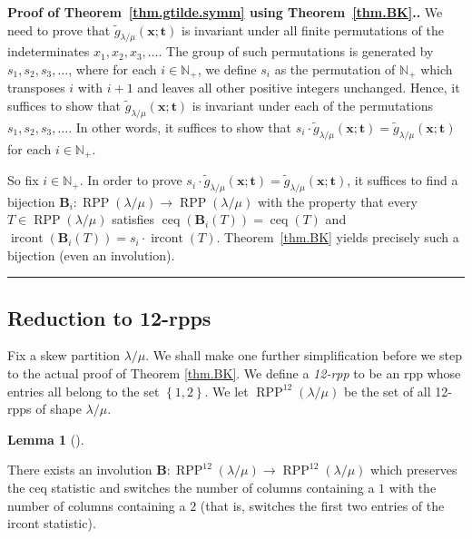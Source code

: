 \documentclass[numbers=enddot,12pt,final,onecolumn,notitlepage]{scrartcl}%
\theoremstyle{definition}
\newtheorem{lem}[theo]{Lemma}
\newenvironment{lemma}[1][]
{\begin{lem}[#1]\begin{leftbar}}
{\end{leftbar}\end{lem}}
\newenvironment{proof}[1][Proof]{\noindent\textbf{#1.} }{\ \rule{0.5em}{0.5em}}
\newcommand{\Nplus}{\mathbb{N}_{+}}
\def\ceq{{\operatorname{ceq}}}
\def\ircont{{\operatorname{ircont}}}
\def\t{{\mathbf{t}}}
\def\x{{\mathbf{x}}}
\def\lm{{\lambda/\mu}}
\def\OneTwoRPP{{\operatorname{RPP}^{12}\left(  \lambda/\mu\right)}}
\begin{document}
\begin{proof}[Proof of Theorem~\ref{thm.gtilde.symm} using
Theorem~\ref{thm.BK}.]
We need to prove that $\widetilde{g}_{\lambda/\mu}(\x;\t)$ is invariant
under all finite permutations of the indeterminates
$x_1, x_2, x_3, \ldots$. The group of such permutations is generated by
$s_1, s_2, s_3, \ldots$, where for each $i \in \Nplus$, we define $s_i$
as the permutation of $\Nplus$ which transposes $i$ with $i+1$ and
leaves all other positive integers unchanged. Hence, it suffices to
show that $\widetilde{g}_{\lambda/\mu}(\x;\t)$ is invariant under each
of the permutations $s_1, s_2, s_3, \ldots$. In other words, it suffices
to show that $s_i \cdot \widetilde{g}_{\lambda/\mu}(\x;\t)
= \widetilde{g}_{\lambda/\mu}(\x;\t)$ for each $i \in \Nplus$.

So fix $i \in \Nplus$. In order to prove
$s_i \cdot \widetilde{g}_{\lambda/\mu}(\x;\t)
= \widetilde{g}_{\lambda/\mu}(\x;\t)$, it suffices to find a bijection
$\mathbf{B}_{i}:\operatorname{RPP}\left(  \lambda/\mu\right)
\rightarrow\operatorname{RPP}\left(  \lambda/\mu\right)  $ with the
property that every $T \in \operatorname{RPP}\left(  \lambda/\mu\right)$
satisfies $\ceq\left(\mathbf{B}_i\left(T\right)\right) = \ceq \left(T\right)$ and
$\ircont\left(\mathbf{B}_i\left(T\right)\right) = s_i \cdot \ircont \left(T\right)$.
Theorem~\ref{thm.BK} yields precisely such a bijection (even an
involution).
\end{proof}

\subsection{Reduction to 12-rpps}

Fix a skew partition $\lm$. We shall make one further simplification before we step to the actual proof of
Theorem \ref{thm.BK}. We define a \textit{12-rpp} to be an rpp whose entries all belong to the set $\left\{  1,2\right\}  $. We let $\OneTwoRPP$ be the set of all 12-rpps of shape $\lm$.

\begin{lemma}
\label{lem.BK} There exists an
involution $\mathbf{B}:\OneTwoRPP\rightarrow\OneTwoRPP$
which preserves the ceq statistic and switches the number of columns containing a $1$ with the number of columns containing a $2$ (that is, switches the first two entries of the ircont statistic).
\end{lemma}
\end{document}

